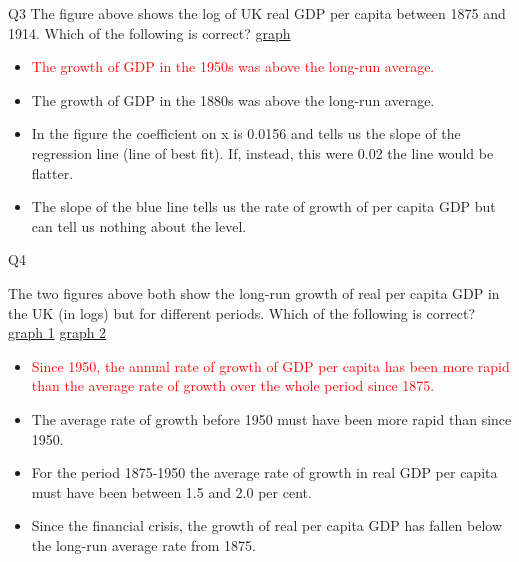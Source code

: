 \documentclass{beamer}
\newcommand{\red}[1]{\textcolor{red}{#1}}
\begin{document}
\begin{frame}{Q3}
\label{slide:Q3}
    The figure above shows the log of UK real GDP per capita between 1875 and 1914. Which of the following is correct? \href{https://drive.google.com/file/d/1LyYAV0U9japlKBuQQsD6nOercA-FlNkn/view?usp=drivesdk}{graph}
    \begin{itemize}
        \item \red{The growth of GDP in the 1950s was above the long-run average.}
        \item The growth of GDP in the 1880s was above the long-run average.
        \item In the figure the coefficient on x is 0.0156 and tells us the slope of the regression line (line of best fit). If, instead, this were 0.02 the line would be flatter.
        \item The slope of the blue line tells us the rate of growth of per capita GDP but can tell us nothing about the level.
    \end{itemize}



\end{frame}

\begin{frame}{Q4}
\label{slide:Q4}

    The two figures above both show the long-run growth of real per capita GDP in the UK (in logs) but for different periods. Which of the following is correct?
    \href{https://drive.google.com/file/d/1LyYAV0U9japlKBuQQsD6nOercA-FlNkn/view?usp=drivesdk}{graph 1}
    \href{https://drive.google.com/file/d/14ayMaL2Lfb2-APF5vq_Q96I9MbFk8fPX/view?usp=drivesdk}{graph 2}
    \begin{itemize}
        \item \red{Since 1950, the annual rate of growth of GDP per capita has been more rapid than the average rate of growth over the whole period since 1875.}
        \item The average rate of growth before 1950 must have been more rapid than since 1950.
        \item For the period 1875-1950 the average rate of growth in real GDP per capita must have been between 1.5 and 2.0 per cent.
        \item Since the financial crisis, the growth of real per capita GDP has fallen below the long-run average rate from 1875.
    \end{itemize}
\end{frame}
\end{document}
